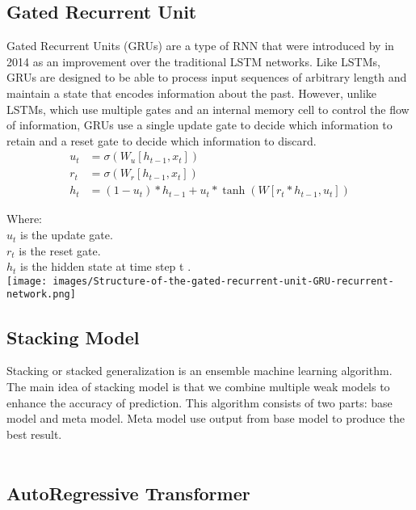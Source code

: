 \documentclass{ieeeojies}
\begin{document}
\subsection{Gated Recurrent Unit}
Gated Recurrent Units (GRUs) are a type of RNN that were introduced by in 2014 as an improvement over the traditional LSTM networks. Like LSTMs, GRUs are designed to be able to process input sequences of arbitrary length and maintain a state that encodes information about the past. However, unlike LSTMs, which use multiple gates and an internal memory cell to control the flow of information, GRUs use a single update gate to decide which information to retain and a reset gate to decide which information to discard.
\begin{align*}
        u_t &= \sigma(W_u [h_{t-1}, x_t]) \\
    r_t &= \sigma(W_r [h_{t-1}, x_t]) \\
    h_t &= (1 - u_t) \ast h_{t-1} + u_t \ast \tanh(W [r_t \ast h_{t-1}, u_t])
\end{align*}


Where: \\
\indent \textbullet \(u_t\) is the update gate.\\
\indent \textbullet \(r_t\) is the reset gate.\\
\indent \textbullet \(h_t\) is the hidden state at time step t .\\
\texttt{[image: images/Structure-of-the-gated-recurrent-unit-GRU-recurrent-network.png]}
\subsection{Stacking Model}
Stacking or stacked generalization is an ensemble machine learning algorithm. The main idea of stacking model is that we combine multiple weak models to enhance the accuracy of prediction. This algorithm consists of two parts: base model and meta model. Meta model use output from base model to produce the best result.\\ \\

\subsection{AutoRegressive Transformer}
\end{document}

